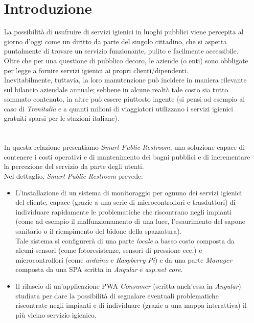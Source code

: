 \documentclass[12pt]{article}
\begin{document}
\section{Introduzione}
La possibilità di usufruire di servizi igienici in luoghi pubblici viene percepita al giorno d'oggi come un diritto da parte del singolo cittadino, che si aspetta puntalmente di trovare un servizio funzionante, pulito e facilmente accessibile.\\
Oltre che per una questione di pubblico decoro, le aziende (o enti) sono obbligate per legge\cite{articolo1} a fornire servizi igienici ai propri clienti/dipendenti.\\
Inevitabilmente, tuttavia, la loro manutenzione può incidere in maniera rilevante sul bilancio aziendale annuale; sebbene in alcune realtà tale costo sia tutto sommato contenuto, in altre può essere piuttosto ingente (si pensi ad esempio al caso di \textit{Trenitalia} e a quanti milioni di viaggiatori utilizzano i servizi igienici gratuiti sparsi per le stazioni italiane).\\
\\\\
In questa relazione presentiamo \textit{Smart Public Restroom}, una soluzione capace di contenere i costi operativi e di mantenimento dei bagni pubblici e di incrementare la percezione del servizio da parte degli utenti.\\
Nel dettaglio, \textit{Smart Public Restroom} prevede:
\begin{itemize}
	\item L'installazione di un sistema di monitoraggio per ognuno dei servizi igienici del cliente, capace (grazie a una serie di microcontrollori e trasduttori) di individuare rapidamente le problematiche che riscontrano negli impianti (come ad esempio il malfunzionamento di una luce, l'esaurimento del sapone sanitario o il riempimento del bidone della spazzatura).\\
	Tale sistema si configurerà di una parte \textit{locale} a basso costo composta da alcuni sensori (come fotoresistenze, sensori di pressione ecc.) e microcontrollori (come \textit{arduino} e \textit{Raspberry Pi}) e da una parte \textit{Manager} composta da una SPA scritta in \textit{Angular} e \textit{asp.net core}.
	\item Il rilascio di un'applicazione PWA \textit{Consumer} (scritta anch'essa in \textit{Angular}) studiata per dare la possibilità di segnalare eventuali problematiche riscontrate negli impianti e di individuare (grazie a una mappa interattiva) il più vicino servizio igienico.\\
\end{itemize}
\end{document}
